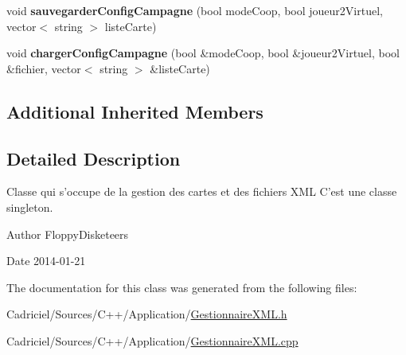 \begin{DoxyCompactItemize}
\item 
\hypertarget{group__inf2990_gaf25915bc26ca653ace2a0b4df3a4d808}{void {\bfseries sauvegarder\-Config\-Campagne} (bool mode\-Coop, bool joueur2\-Virtuel, vector$<$ string $>$ liste\-Carte)}\label{group__inf2990_gaf25915bc26ca653ace2a0b4df3a4d808}

\item 
\hypertarget{group__inf2990_ga2020824a2c8ca40060649cd759f728f5}{void {\bfseries charger\-Config\-Campagne} (bool \&mode\-Coop, bool \&joueur2\-Virtuel, bool \&fichier, vector$<$ string $>$ \&liste\-Carte)}\label{group__inf2990_ga2020824a2c8ca40060649cd759f728f5}

\end{DoxyCompactItemize}
\subsection*{Additional Inherited Members}


\subsection{Detailed Description}
Classe qui s'occupe de la gestion des cartes et des fichiers X\-M\-L C'est une classe singleton. 

\begin{DoxyAuthor}{Author}
Floppy\-Disketeers 
\end{DoxyAuthor}
\begin{DoxyDate}{Date}
2014-\/01-\/21 
\end{DoxyDate}


The documentation for this class was generated from the following files\-:\begin{DoxyCompactItemize}
\item 
Cadriciel/\-Sources/\-C++/\-Application/\hyperlink{_gestionnaire_x_m_l_8h}{Gestionnaire\-X\-M\-L.\-h}\item 
Cadriciel/\-Sources/\-C++/\-Application/\hyperlink{_gestionnaire_x_m_l_8cpp}{Gestionnaire\-X\-M\-L.\-cpp}\end{DoxyCompactItemize}
